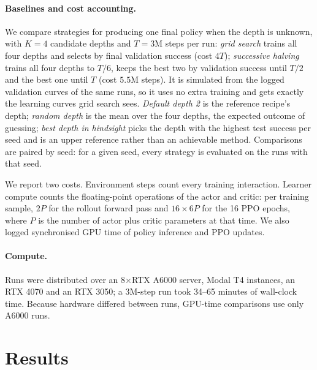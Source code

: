 \documentclass{article}
\begin{document}
\paragraph{Baselines and cost accounting.}
We compare strategies for producing one final policy when the depth is unknown, with $K=4$ candidate depths and $T=3$M steps per run:
\emph{grid search} trains all four depths and selects by final validation success (cost $4T$);
\emph{successive halving} \citep{jamieson2016sh} trains all four depths to $T/6$, keeps the best two by validation success until $T/2$ and the best one until $T$ (cost $5.5$M steps).
It is simulated from the logged validation curves of the same runs, so it uses no extra training and gets exactly the learning curves grid search sees.
\emph{Default depth 2} is the reference recipe's depth; \emph{random depth} is the mean over the four depths, the expected outcome of guessing;
\emph{best depth in hindsight} picks the depth with the highest test success per seed and is an upper reference rather than an achievable method.
Comparisons are paired by seed: for a given seed, every strategy is evaluated on the runs with that seed.

We report two costs.
Environment steps count every training interaction.
Learner compute counts the floating-point operations of the actor and critic: per training sample, $2P$ for the rollout forward pass and $16\times 6P$ for the 16 PPO epochs, where $P$ is the number of actor plus critic parameters at that time.
We also logged synchronised GPU time of policy inference and PPO updates.

\paragraph{Compute.}
Runs were distributed over an 8$\times$RTX A6000 server, Modal T4 instances, an RTX 4070 and an RTX 3050; a 3M-step run took 34--65 minutes of wall-clock time.
Because hardware differed between runs, GPU-time comparisons use only A6000 runs.

\section{Results}
\end{document}
